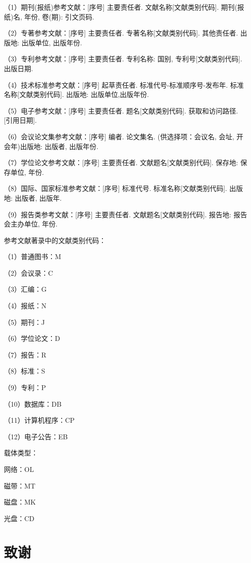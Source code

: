 （1）期刊(报纸)参考文献：[序号] 主要责任者. 文献名称[文献类别代码]. 期刊(报纸)名, 年份, 卷(期): 引文页码.

（2）专著参考文献：[序号] 主要责任者. 专著名称[文献类别代码]. 其他责任者. 出版地: 出版单位, 出版年份.

（3）专利参考文献：[序号] 主要责任者. 专利名称: 国别, 专利号[文献类别代码]. 出版日期.

（4）技术标准参考文献：[序号] 起草责任者. 标准代号-标准顺序号-发布年. 标准名称[文献类别代码]. 出版地: 出版单位,出版年份.

（5）电子参考文献：[序号] 主要责任者. 题名[文献类别代码]. 获取和访问路径. [引用日期].

（6）会议论文集参考文献：[序号] 编者. 论文集名. (供选择项：会议名, 会址, 开会年)出版地: 出版者, 出版年份.

（7）学位论文参考文献：[序号]  主要责任者. 文献题名[文献类别代码]. 保存地: 保存单位, 年份.

（8）国际、国家标准参考文献：[序号] 标准代号. 标准名称[文献类别代码]. 出版地: 出版者, 出版年.

（9）报告类参考文献：[序号] 主要责任者. 文献题名[文献类别代码]. 报告地: 报告会主办单位, 年份.

参考文献著录中的文献类别代码：

（1）普通图书：M     \par
（2）会议录：C       \par
（3）汇编：G         \par
（4）报纸：N         \par
（5）期刊：J         \par
（6）学位论文：D     \par
（7）报告：R         \par
（8）标准：S         \par
（9）专利：P         \par
（10）数据库：DB     \par
（11）计算机程序：CP \par
（12）电子公告：EB   \par
载体类型：           \par
网络：OL             \par
磁带：MT             \par
磁盘：MK             \par
光盘：CD

\section{致谢}

